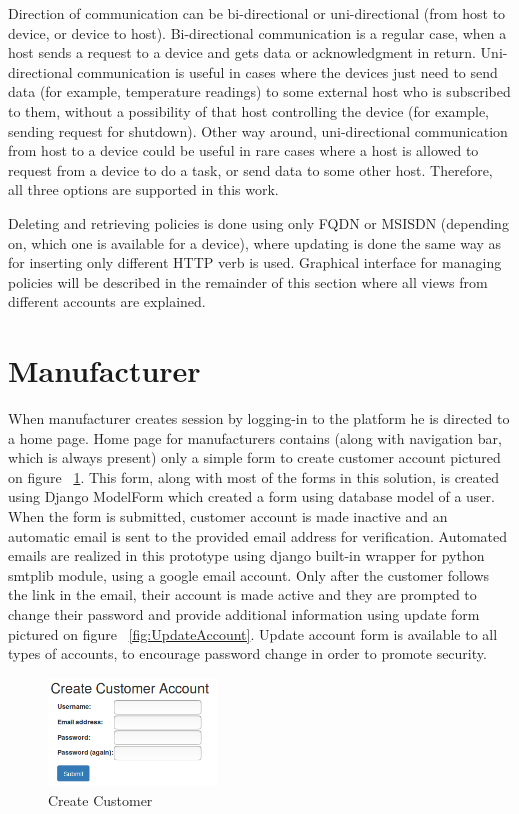 Direction of communication can be bi-directional or uni-directional (from host to device, or device to host). Bi-directional communication is a regular case, when a host sends a request to a device and gets data or acknowledgment in return. Uni-directional communication is useful in cases where the devices just need to send data (for example, temperature readings) to some external host who is subscribed to them, without a possibility of that host controlling the device (for example, sending request for shutdown). Other way around, uni-directional communication from host to a device could be useful in rare cases where a host is allowed to request from a device to do a task, or send data to some other host. Therefore, all three options are supported in this work.

Deleting and retrieving policies is done using only FQDN or MSISDN (depending on, which one is available for a device), where updating is done the same way as for inserting only different HTTP verb is used. Graphical interface for managing policies will be described in the remainder of this section where all views from different accounts are explained.

\section{Manufacturer}
\label{Manufacturer}

When manufacturer creates session by logging-in to the platform he is directed to a home page. Home page for manufacturers contains (along with navigation bar, which is always present) only a simple form to create customer account pictured on figure ~\ref{fig:CreateCustomer}. This form, along with most of the forms in this solution, is created using Django ModelForm which created a form using database model of a user. When the form is submitted, customer account is made inactive and an automatic email is sent to the provided email address for verification. Automated emails are realized in this prototype using django built-in wrapper for python smtplib module, using a google email account. Only after the customer follows the link in the email, their account is made active and they are prompted to change their password and provide additional information using update form pictured on figure ~\ref{fig:UpdateAccount}. Update account form is available to all types of accounts, to encourage password change in order to promote security.

\begin{figure}
	\begin{center}
		\includegraphics[width=0.4\textwidth]{images/implementation/CreateCustomer}
		\caption{Create Customer}
		\label{fig:CreateCustomer}
	\end{center}
\end{figure}

